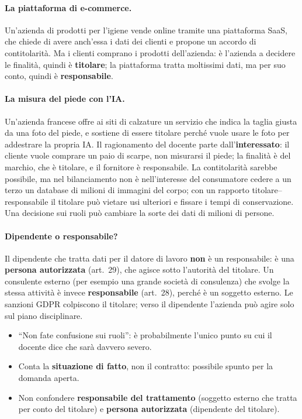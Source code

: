 \paragraph{La piattaforma di e-commerce.} Un'azienda di prodotti per l'igiene vende online tramite una
piattaforma SaaS, che chiede di avere anch'essa i dati dei clienti e propone un accordo di
contitolarità. Ma i clienti comprano i prodotti dell'azienda: è l'azienda a decidere le finalità, quindi
è \textbf{titolare}; la piattaforma tratta moltissimi dati, ma per suo conto, quindi è
\textbf{responsabile}.

\paragraph{La misura del piede con l'IA.} Un'azienda francese offre ai siti di calzature un servizio che
indica la taglia giusta da una foto del piede, e sostiene di essere titolare perché vuole usare le foto
per addestrare la propria IA. Il ragionamento del docente parte dall'\textbf{interessato}: il cliente
vuole comprare un paio di scarpe, non misurarsi il piede; la finalità è del marchio, che è titolare, e il
fornitore è responsabile. La contitolarità sarebbe possibile, ma nel bilanciamento non è nell'interesse
del consumatore cedere a un terzo un database di milioni di immagini del corpo; con un rapporto
titolare--responsabile il titolare può vietare usi ulteriori e fissare i tempi di conservazione. Una
decisione sui ruoli può cambiare la sorte dei dati di milioni di persone.

\paragraph{Dipendente o responsabile?} Il dipendente che tratta dati per il datore di lavoro
\textbf{non} è un responsabile: è una \textbf{persona autorizzata} (art.~29), che agisce sotto
l'autorità del titolare. Un consulente esterno (per esempio una grande società di consulenza) che svolge
la stessa attività è invece \textbf{responsabile} (art.~28), perché è un soggetto esterno. Le sanzioni
GDPR colpiscono il titolare; verso il dipendente l'azienda può agire solo sul piano disciplinare.

\begin{esame}
\begin{itemize}
  \item ``Non fate confusione sui ruoli'': è probabilmente l'unico punto su cui il docente dice che sarà
    davvero severo.
  \item Conta la \textbf{situazione di fatto}, non il contratto: possibile spunto per la domanda aperta.
  \item Non confondere \textbf{responsabile del trattamento} (soggetto esterno che tratta per conto del
    titolare) e \textbf{persona autorizzata} (dipendente del titolare).
\end{itemize}
\end{esame}

